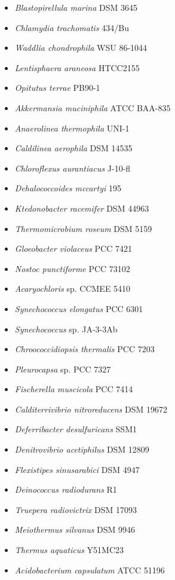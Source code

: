 \begin{itemize}
    \item \textit{Blastopirellula marina} DSM 3645
    \item \textit{Chlamydia trachomatis} 434/Bu
    \item \textit{Waddlia chondrophila} WSU 86-1044
    \item \textit{Lentisphaera araneosa} HTCC2155
    \item \textit{Opitutus terrae} PB90-1
    \item \textit{Akkermansia muciniphila} ATCC BAA-835
    \item \textit{Anaerolinea thermophila} UNI-1
    \item \textit{Caldilinea aerophila} DSM 14535
    \item \textit{Chloroflexus aurantiacus} J-10-fl
    \item \textit{Dehalococcoides mccartyi} 195
    \item \textit{Ktedonobacter racemifer} DSM 44963
    \item \textit{Thermomicrobium roseum} DSM 5159
    \item \textit{Gloeobacter violaceus} PCC 7421
    \item \textit{Nostoc punctiforme} PCC 73102
    \item \textit{Acaryochloris} sp. CCMEE 5410
    \item \textit{Synechococcus elongatus} PCC 6301
    \item \textit{Synechococcus} sp. JA-3-3Ab
    \item \textit{Chroococcidiopsis thermalis} PCC 7203
    \item \textit{Pleurocapsa} sp. PCC 7327
    \item \textit{Fischerella muscicola} PCC 7414
    \item \textit{Calditerrivibrio nitroreducens} DSM 19672
    \item \textit{Deferribacter desulfuricans} SSM1
    \item \textit{Denitrovibrio acetiphilus} DSM 12809
    \item \textit{Flexistipes sinusarabici} DSM 4947
    \item \textit{Deinococcus radiodurans} R1
    \item \textit{Truepera radiovictrix} DSM 17093
    \item \textit{Meiothermus silvanus} DSM 9946
    \item \textit{Thermus aquaticus} Y51MC23
    \item \textit{Acidobacterium capsulatum} ATCC 51196

\end{itemize}
